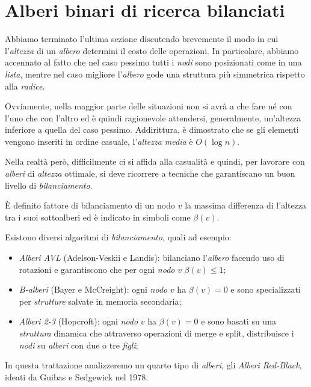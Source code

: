 \section{Alberi binari di ricerca bilanciati}
Abbiamo terminato l'ultima sezione discutendo brevemente il modo in cui
l'\emph{altezza} di un \emph{albero} determini il costo delle operazioni. In
particolare, abbiamo accennato al fatto che nel caso pessimo tutti i \emph{nodi}
sono posizionati come in una \emph{lista}, mentre nel caso migliore
l'\emph{albero} gode una struttura più simmetrica rispetto alla \emph{radice}.

Ovviamente, nella maggior parte delle situazioni non si avrà a che fare né con
l'uno che con l'altro ed è quindi ragionevole attendersi, generalmente,
un'altezza inferiore a quella del caso pessimo. Addirittura, è dimostrato che
se gli elementi vengono inseriti in ordine casuale, l'\emph{altezza media} è
$O(\log n)$.

Nella realtà però, difficilmente ci si affida alla casualità e quindi, per
lavorare con \emph{alberi} di \emph{altezza} ottimale, si deve ricorrere a
tecniche che garantiscano un buon livello di \emph{bilanciamento}.

\begin{definition}
    È definito fattore di bilanciamento di un nodo $v$ la massima differenza
    di l'altezza tra i suoi sottoalberi ed è indicato in simboli come $\beta(v)$.
\end{definition}\noindent
Esistono diversi algoritmi di \emph{bilanciamento}, quali ad esempio:
\begin{itemize}
    \item \emph{Alberi AVL} (Adelson-Veskii e Landis): bilanciano l'\emph{albero}
    facendo uso di rotazioni e garantiscono che per ogni \emph{nodo} $v$
    $\beta(v)\leq1$;
    \item \emph{B-alberi} (Bayer e McCreight): ogni \emph{nodo} $v$ ha
    $\beta(v)=0$ e sono specializzati per \emph{strutture} salvate in memoria
    secondaria;
    \item \emph{Alberi 2-3} (Hopcroft): ogni \emph{nodo} $v$ ha $\beta(v)=0$ e
    sono basati su una \emph{struttura} dinamica che attraverso operazioni di
    merge e split, distribuisce i \emph{nodi} su \emph{alberi} con due o tre
    \emph{figli};
\end{itemize}
In questa trattazione analizzeremo un quarto tipo di \emph{alberi}, gli
\emph{Alberi Red-Black}, ideati da Guibas e Sedgewick nel 1978.

